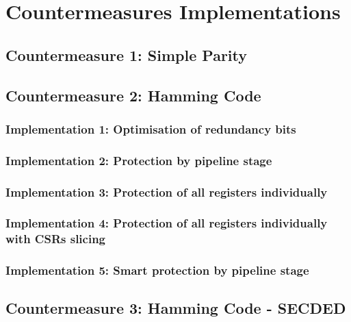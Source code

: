 \chapter{Countermeasures Implementations}
\label{chapter:countermeasures}
\minitoc


\section{Countermeasure 1: Simple Parity}


\section{Countermeasure 2: Hamming Code}

    \subsection{Implementation 1: Optimisation of redundancy bits}

    \subsection{Implementation 2: Protection by pipeline stage}

    \subsection{Implementation 3: Protection of all registers individually}

    \subsection{Implementation 4: Protection of all registers individually with CSRs slicing}

    \subsection{Implementation 5: Smart protection by pipeline stage}

\section{Countermeasure 3: Hamming Code - SECDED}

